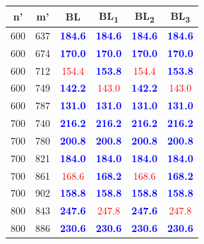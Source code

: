 \begin{tabular}{|c|c|c|c|c|c|}
\hline
\rowcolor{gray!30} \textbf{n'} &  \textbf{m'} &  \textbf{BL} &  \textbf{BL\textsubscript{1}} &  \textbf{BL\textsubscript{2}} &  \textbf{BL\textsubscript{3}}\\ \hline
600 & 637 & \textbf{\textcolor{blue}{184.6}} & \textbf{\textcolor{blue}{184.6}} & \textbf{\textcolor{blue}{184.6}} & \textbf{\textcolor{blue}{184.6}}\\
600 & 674 & \textbf{\textcolor{blue}{170.0}} & \textbf{\textcolor{blue}{170.0}} & \textbf{\textcolor{blue}{170.0}} & \textbf{\textcolor{blue}{170.0}}\\
600 & 712 & \textcolor{red}{154.4} & \textbf{\textcolor{blue}{153.8}} & \textcolor{red}{154.4} & \textbf{\textcolor{blue}{153.8}}\\
600 & 749 & \textbf{\textcolor{blue}{142.2}} & \textcolor{red}{143.0} & \textbf{\textcolor{blue}{142.2}} & \textcolor{red}{143.0}\\
600 & 787 & \textbf{\textcolor{blue}{131.0}} & \textbf{\textcolor{blue}{131.0}} & \textbf{\textcolor{blue}{131.0}} & \textbf{\textcolor{blue}{131.0}}\\
700 & 740 & \textbf{\textcolor{blue}{216.2}} & \textbf{\textcolor{blue}{216.2}} & \textbf{\textcolor{blue}{216.2}} & \textbf{\textcolor{blue}{216.2}}\\
700 & 780 & \textbf{\textcolor{blue}{200.8}} & \textbf{\textcolor{blue}{200.8}} & \textbf{\textcolor{blue}{200.8}} & \textbf{\textcolor{blue}{200.8}}\\
700 & 821 & \textbf{\textcolor{blue}{184.0}} & \textbf{\textcolor{blue}{184.0}} & \textbf{\textcolor{blue}{184.0}} & \textbf{\textcolor{blue}{184.0}}\\
700 & 861 & \textcolor{red}{168.6} & \textbf{\textcolor{blue}{168.2}} & \textcolor{red}{168.6} & \textbf{\textcolor{blue}{168.2}}\\
700 & 902 & \textbf{\textcolor{blue}{158.8}} & \textbf{\textcolor{blue}{158.8}} & \textbf{\textcolor{blue}{158.8}} & \textbf{\textcolor{blue}{158.8}}\\
800 & 843 & \textbf{\textcolor{blue}{247.6}} & \textcolor{red}{247.8} & \textbf{\textcolor{blue}{247.6}} & \textcolor{red}{247.8}\\
800 & 886 & \textbf{\textcolor{blue}{230.6}} & \textbf{\textcolor{blue}{230.6}} & \textbf{\textcolor{blue}{230.6}} & \textbf{\textcolor{blue}{230.6}}\\

\end{tabular}
